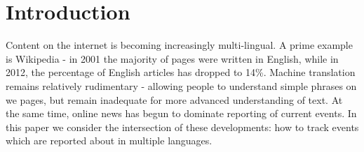 \documentclass[twoside,11pt]{article}
\begin{document}
%
%

\section{Introduction}

Content on the internet is becoming increasingly multi-lingual. A prime example is Wikipedia - in 2001 the majority of pages were written in English, while in 2012, the percentage of English articles has dropped to 14\%. Machine translation remains relatively rudimentary - allowing people to understand simple phrases on we pages, but remain inadequate for more advanced understanding of text. At the same time, online news has begun to dominate reporting of current events. In this paper we consider the intersection of these developments: how to track events which are reported about in multiple languages.
\end{document}
